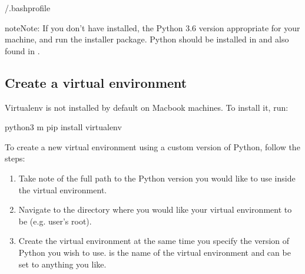 \documentclass[letterpaper,10pt,english]{sphinxmanual}
\begin{document}
\begin{sphinxVerbatim}[commandchars=\\\{\}]
\PYGZdl{}  \PYGZti{}/.bash\PYGZus{}profile
\end{sphinxVerbatim}

\begin{sphinxadmonition}{note}{Note:}
If you don’t have  installed,  the Python 3.6 version appropriate for your machine, and run the installer package. Python should be installed in  and also found in .
\end{sphinxadmonition}


\subsection{Create a virtual environment}
\label{\detokenize{intro/getting-started-with-build:create-a-virtual-environment}}\label{\detokenize{intro/getting-started-with-build:create-virtual-environment}}
Virtualenv is not installed by default on Macbook machines. To install it, run:

\begin{sphinxVerbatim}[commandchars=\\\{\}]
\PYGZdl{} python3 \PYGZhy{}m pip install virtualenv
\end{sphinxVerbatim}

To create a new virtual environment using a custom version of Python, follow the steps:
\begin{enumerate}
%
\item {} 
Take note of the full path to the Python version you would like to use inside the virtual environment.

\item {} 
Navigate to the directory where you would like your virtual environment to be (e.g. user’s root).

\item {} 
Create the virtual environment at the same time you specify the version of Python you wish to use.  is the name of the virtual environment and can be set to anything you like.

\end{enumerate}
\end{document}
